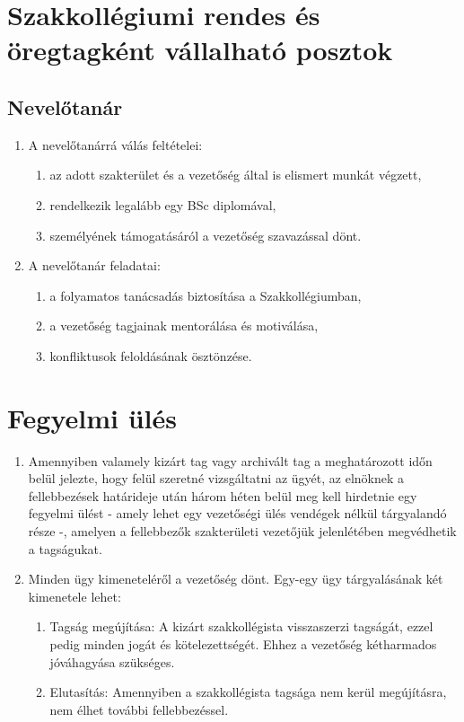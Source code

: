 \documentclass[12pt]{report}
\begin{document}
\section{Szakkollégiumi rendes és öregtagként vállalható posztok}

\subsection{Nevelőtanár}
\begin{enumerate}
  \item A nevelőtanárrá válás feltételei:
  \begin{enumerate}
    \item az adott szakterület és a vezetőség által is elismert munkát végzett,
    \item rendelkezik legalább egy BSc diplomával,
    \item személyének támogatásáról a vezetőség szavazással dönt.
  \end{enumerate}
  \item A nevelőtanár feladatai:
  \begin{enumerate}
    \item a folyamatos tanácsadás biztosítása a Szakkollégiumban,
    \item a vezetőség tagjainak mentorálása és motiválása,
    \item konfliktusok feloldásának ösztönzése.
  \end{enumerate}
\end{enumerate}

\section{Fegyelmi ülés}

\begin{enumerate}
  \item Amennyiben valamely kizárt tag vagy archivált tag a meghatározott időn belül jelezte, hogy felül szeretné vizsgáltatni az ügyét, az elnöknek a fellebbezések határideje 
    után három héten belül meg kell hirdetnie egy fegyelmi ülést - amely lehet egy vezetőségi ülés vendégek nélkül tárgyalandó része -, amelyen a fellebbezők szakterületi vezetőjük 
    jelenlétében megvédhetik a tagságukat.
  \item Minden ügy kimeneteléről a vezetőség dönt. Egy-egy ügy tárgyalásának két kimenetele lehet:
  \begin{enumerate}
    \item Tagság megújítása: A kizárt szakkollégista visszaszerzi tagságát, ezzel pedig minden jogát és kötelezettségét. Ehhez a vezetőség kétharmados jóváhagyása szükséges. 
    \item Elutasítás: Amennyiben a szakkollégista tagsága nem kerül megújításra, nem élhet további fellebbezéssel.
  \end{enumerate}
\end{enumerate}
\end{document}
